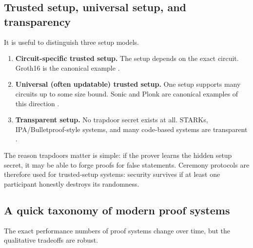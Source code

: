 \documentclass[11pt]{article}
\begin{document}
\subsection{Trusted setup, universal setup, and transparency}

It is useful to distinguish three setup models.

\begin{enumerate}[leftmargin=2em]
    \item \textbf{Circuit-specific trusted setup.} The setup depends on the exact circuit. Groth16 is the canonical example \cite{Groth2016}.
    \item \textbf{Universal (often updatable) trusted setup.} One setup supports many circuits up to some size bound. Sonic and Plonk are canonical examples of this direction \cite{MallerBoweKohlweissMeiklejohn2019,GabizonWilliamsonCiobotaru2019}.
    \item \textbf{Transparent setup.} No trapdoor secret exists at all. STARKs, IPA/Bulletproof-style systems, and many code-based systems are transparent \cite{Bulletproofs2018,BenSassonBentovHoreshRiabzev2018STARK}.
\end{enumerate}

The reason trapdoors matter is simple: if the prover learns the hidden setup secret, it may be able to forge proofs for false statements. Ceremony protocols are therefore used for trusted-setup systems: security survives if at least one participant honestly destroys its randomness.

\subsection{A quick taxonomy of modern proof systems}

The exact performance numbers of proof systems change over time, but the qualitative tradeoffs are robust.
\end{document}
